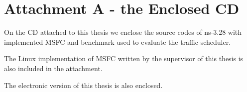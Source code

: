 \documentclass[12pt,a4paper,twoside,openright]{report}
\let\openright=\cleardoublepage
\begin{document}



\tableofcontents










\renewcommand{\nomname}{List of Abbreviations}

\appendix



\section*{Attachment A - the Enclosed CD}
\label{attachment}
On the CD attached to this thesis we enclose the source codes of ns-3.28 with implemented MSFC and benchmark used to evaluate the traffic scheduler.

The Linux implementation of MSFC written by the supervisor of this thesis is also included in the attachment. 

The electronic version of this thesis is also enclosed.

\openright
\end{document}
